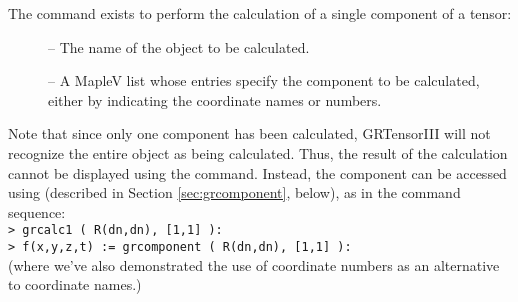 \documentclass{article}
\begin{document}
The command  exists to perform the calculation of a single
component of a tensor:\\
%
\begin{cmdspec}
  \label{spec:grcalc1}

  \begin{description}
    \item[] -- The name of the object to be calculated.
    \item[] -- A MapleV list whose entries specify the
      component to be calculated, either by indicating the coordinate names
      or numbers.
  \end{description}

\end{cmdspec}

Note that since only one component has been calculated, GRTensorIII 
will not recognize the entire object as being calculated. Thus, the 
result of the calculation cannot be displayed using the 
command. Instead, the component can be accessed using 
(described in Section \ref{sec:grcomponent}, below), as in the command
sequence:\\

\noindent\texttt{> grcalc1 ( R(dn,dn), [1,1] ):} \\
\texttt{> f(x,y,z,t) := grcomponent ( R(dn,dn), [1,1] ):}\\

\noindent (where we've also demonstrated the use of coordinate numbers
as an alternative to coordinate names.)
%
\end{document}
